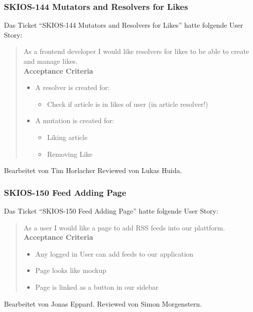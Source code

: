 \subsubsection{SKIOS-144 Mutators and Resolvers for Likes}
Das Ticket \enquote{SKIOS-144 Mutators and Resolvers for Likes} hatte folgende User Story:
\begin{quotation}
    As a frontend developer I would like resolvers for likes to be able to create and manage likes. \\
\textbf{Acceptance Criteria}
\begin{itemize}
    \item A resolver is created for:
    \begin{itemize}
        \item Check if article is in likes of user (in article resolver!)
    \end{itemize}
    \item A mutation is created for:
    \begin{itemize}
        \item Liking article
        \item Removing Like
    \end{itemize}
\end{itemize}
\end{quotation}
Bearbeitet von Tim Horlacher
Reviewed von Lukas Huida.

\subsubsection{SKIOS-150 Feed Adding Page} \label{story:150}
Das Ticket \enquote{SKIOS-150 Feed Adding Page} hatte folgende User Story:
\begin{quotation}
    As a user I would like a page to add RSS feeds into our plattform.
\textbf{Acceptance Criteria}
\begin{itemize}
    \item Any logged in User can add feeds to our application
    \item Page looks like mockup
    \item Page is linked as a button in our sidebar
\end{itemize}
\end{quotation}
Bearbeitet von Jonas Eppard.
Reviewed von Simon Morgenstern.

